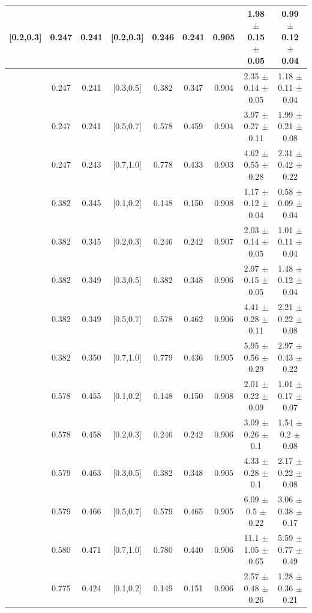 \begin{table}[H]
\begin{tabular}{|c|c|c|c|c|c|c|c|c|}
[0.2,0.3]	&	0.247	&	0.241	&	[0.2,0.3]	&	0.246	&	0.241	&	0.905	&1.98  $\pm$ 0.15  $\pm$ 0.05   &	0.99  $\pm$ 0.12  $\pm$ 0.04  \\ \hline
[0.2,0.3]	&	0.247	&	0.241	&	[0.3,0.5]	&	0.382	&	0.347	&	0.904	&2.35  $\pm$ 0.14  $\pm$ 0.05   &	1.18  $\pm$ 0.11  $\pm$ 0.04  \\ \hline
[0.2,0.3]	&	0.247	&	0.241	&	[0.5,0.7]	&	0.578	&	0.459	&	0.904	&3.97  $\pm$ 0.27  $\pm$ 0.11   &	1.99  $\pm$ 0.21  $\pm$ 0.08  \\ \hline
[0.2,0.3]	&	0.247	&	0.243	&	[0.7,1.0]	&	0.778	&	0.433	&	0.903	&4.62  $\pm$ 0.55  $\pm$ 0.28   &	2.31  $\pm$ 0.42  $\pm$ 0.22  \\ \hline
\hline
[0.3,0.5]	&	0.382	&	0.345	&	[0.1,0.2]	&	0.148	&	0.150	&	0.908	&1.17  $\pm$ 0.12  $\pm$ 0.04   &	0.58  $\pm$ 0.09  $\pm$ 0.04  \\ \hline
[0.3,0.5]	&	0.382	&	0.345	&	[0.2,0.3]	&	0.246	&	0.242	&	0.907	&2.03  $\pm$ 0.14  $\pm$ 0.05   &	1.01  $\pm$ 0.11  $\pm$ 0.04  \\ \hline
[0.3,0.5]	&	0.382	&	0.349	&	[0.3,0.5]	&	0.382	&	0.348	&	0.906	&2.97  $\pm$ 0.15  $\pm$ 0.05   &	1.48  $\pm$ 0.12  $\pm$ 0.04  \\ \hline
[0.3,0.5]	&	0.382	&	0.349	&	[0.5,0.7]	&	0.578	&	0.462	&	0.906	&4.41  $\pm$ 0.28  $\pm$ 0.11   &	2.21  $\pm$ 0.22  $\pm$ 0.08  \\ \hline
[0.3,0.5]	&	0.382	&	0.350	&	[0.7,1.0]	&	0.779	&	0.436	&	0.905	&5.95  $\pm$ 0.56  $\pm$ 0.29   &	2.97  $\pm$ 0.43  $\pm$ 0.22  \\ \hline
\hline
[0.5,0.7]	&	0.578	&	0.455	&	[0.1,0.2]	&	0.148	&	0.150	&	0.908	&2.01  $\pm$ 0.22  $\pm$ 0.09   &	1.01  $\pm$ 0.17  $\pm$ 0.07  \\ \hline
[0.5,0.7]	&	0.578	&	0.458	&	[0.2,0.3]	&	0.246	&	0.242	&	0.906	&3.09  $\pm$ 0.26  $\pm$ 0.1    &	1.54  $\pm$ 0.2  $\pm$ 0.08   \\ \hline
[0.5,0.7]	&	0.579	&	0.463	&	[0.3,0.5]	&	0.382	&	0.348	&	0.905	&4.33  $\pm$ 0.28  $\pm$ 0.1    &	2.17  $\pm$ 0.22  $\pm$ 0.08  \\ \hline
[0.5,0.7]	&	0.579	&	0.466	&	[0.5,0.7]	&	0.579	&	0.465	&	0.905	&6.09  $\pm$ 0.5  $\pm$ 0.22    &	3.06  $\pm$ 0.38  $\pm$ 0.17  \\ \hline
[0.5,0.7]	&	0.580	&	0.471	&	[0.7,1.0]	&	0.780	&	0.440	&	0.906	&11.1  $\pm$ 1.05  $\pm$ 0.65   &	5.59  $\pm$ 0.77  $\pm$ 0.49  \\ \hline
\hline
[0.7,1.0]	&	0.775	&	0.424	&	[0.1,0.2]	&	0.149	&	0.151	&	0.906	&2.57  $\pm$ 0.48  $\pm$ 0.26   &	1.28  $\pm$ 0.36  $\pm$ 0.21  \\ \hline

\end{tabular}
\end{table}
